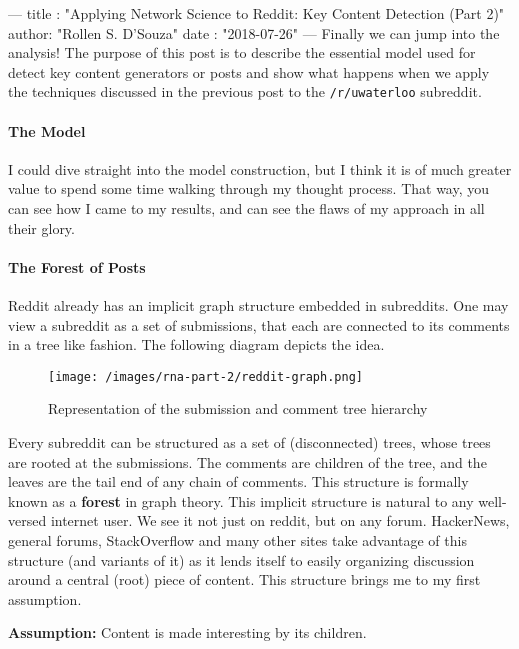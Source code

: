 ---
title :   "Applying Network Science to Reddit: Key Content Detection (Part 2)"
author:   "Rollen S. D'Souza"
date  :   "2018-07-26"
---
Finally we can jump into the analysis!
The purpose of this post is to describe the essential model used for detect key content generators or posts and show what happens when we apply the techniques discussed in the previous post to the \texttt{/r/uwaterloo} subreddit.

\paragraph{The Model}
I could dive straight into the model construction, but I think it is of much greater value to spend some time walking through my thought process.
That way, you can see how I came to my results, and can see the flaws of my approach in all their glory.

\paragraph{The Forest of Posts}
Reddit already has an implicit graph structure embedded in subreddits. One may view a subreddit as a set of submissions, that each are connected to its comments in a tree like fashion. The following diagram depicts the idea.
%
\begin{figure}
    \texttt{[image: /images/rna-part-2/reddit-graph.png]}
    \caption{Representation of the submission and comment tree hierarchy}
\end{figure}
%
Every subreddit can be structured as a set of (disconnected) trees, whose trees are rooted at the submissions.
The comments are children of the tree, and the leaves are the tail end of any chain of comments.
This structure is formally known as a \textbf{forest} in graph theory.
This implicit structure is natural to any well-versed internet user.
We see it not just on reddit, but on any forum.
HackerNews, general forums, StackOverflow and many other sites take advantage of this structure (and variants of it) as it lends itself to easily organizing discussion around a central (root) piece of content.
This structure brings me to my first assumption.

\textbf{Assumption:} Content is made interesting by its children.

